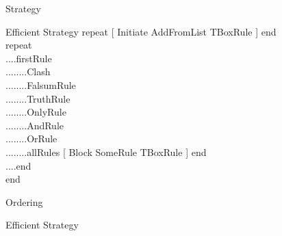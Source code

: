 \documentclass{beamer}
\begin{document}



\begin{frame}{Strategy}

\begin{block}{Efficient Strategy}
repeat [ Initiate AddFromList TBoxRule ] end\\
repeat\\
....firstRule\\
........Clash\\
........FalsumRule\\
........TruthRule\\
........OnlyRule\\
........AndRule\\
........OrRule\\
........allRules [ Block SomeRule TBoxRule ] end \\
....end\\
end
\end{block}

\end{frame}

\begin{frame}{Ordering}
\begin{block}{Efficient Strategy}
\end{block}

\end{frame}
\end{document}
